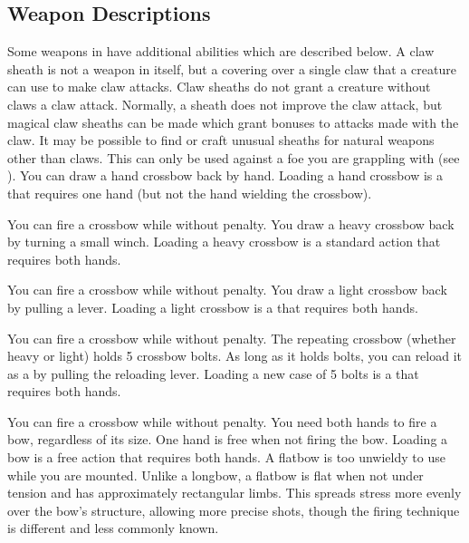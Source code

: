     \subsection{Weapon Descriptions}
        Some weapons in  have additional abilities which are described below.
         A claw sheath is not a weapon in itself, but a covering over a single claw that a creature can use to make claw attacks. Claw sheaths do not grant a creature without claws a claw attack. Normally, a sheath does not improve the claw attack, but magical claw sheaths can be made which grant bonuses to attacks made with the claw. It may be possible to find or craft unusual sheaths for natural weapons other than claws.
         This  can only be used against a foe you are grappling with (see ).
         You can draw a hand crossbow back by hand. Loading a hand crossbow is a  that requires one hand (but not the hand wielding the crossbow).
        \par You can fire a crossbow while \prone without penalty.
         You draw a heavy crossbow back by turning a small winch. Loading a heavy crossbow is a standard action that requires both hands.
        \par You can fire a crossbow while \prone without penalty.
         You draw a light crossbow back by pulling a lever. Loading a light crossbow is a  that requires both hands.
        \par You can fire a crossbow while \prone without penalty.
         The repeating crossbow (whether heavy or light) holds 5 crossbow bolts. As long as it holds bolts, you can reload it as a  by pulling the reloading lever. Loading a new case of 5 bolts is a  that requires both hands.
        \par You can fire a crossbow while \prone without penalty.
         You need both hands to fire a bow, regardless of its size. One hand is free when not firing the bow. Loading a bow is a free action that requires both hands. A flatbow is too unwieldy to use while you are mounted.
        Unlike a longbow, a flatbow is flat when not under tension and has approximately rectangular limbs.
        This spreads stress more evenly over the bow's structure, allowing more precise shots, though the firing technique is different and less commonly known.
